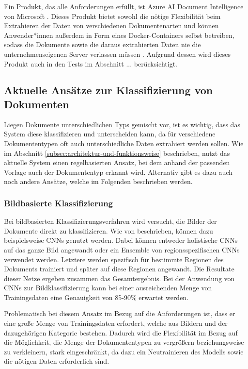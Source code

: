 Ein Produkt, das alle Anforderungen erfüllt, ist Azure AI Document Intelligence von Microsoft \parencite{microsoft_azureai_documentintelligence}. Dieses Produkt bietet sowohl die nötige Flexibilität beim Extrahieren der Daten von verschiedenen Dokumentenarten und können Anwender*innen außerdem in Form eines Docker-Containers selbst betreiben, sodass die Dokumente sowie die daraus extrahierten Daten nie die unternehmenseigenen Server verlassen müssen \parencite{microsoft_azureai_documentintelligence_containers}. Aufgrund dessen wird dieses Produkt auch in den Tests im Abschnitt ... berücksichtigt.

\subsection{Aktuelle Ansätze zur Klassifizierung von Dokumenten}
\label{subsec:aktuelle-ansätze-zur-klassifizierung-von-dokumenten}

Liegen Dokumente unterschiedlichen Typs gemischt vor, ist es wichtig, dass das System diese klassifizieren und unterscheiden kann, da für verschiedene Dokumententypen oft auch unterschiedliche Daten extrahiert werden sollen. Wie im Abschnitt \ref{subsec:architektur-und-funktionsweise} beschrieben, nutzt das aktuelle System einen regelbasierten Ansatz, bei dem anhand der passenden Vorlage auch der Dokumententyp erkannt wird. Alternativ gibt es dazu auch noch andere Ansätze, welche im Folgenden beschrieben werden.

\subsubsection{Bildbasierte Klassifizierung}
\label{subsubsec:bild-basierte-klassifizieurng}

Bei bildbasierten Klassifizierungsverfahren wird versucht, die Bilder der Dokumente direkt zu klassifizieren. Wie von \textcite{HarleyAdamW2015EoDC} beschrieben, können dazu beispielsweise CNNs genutzt werden. Dabei können entweder holistische CNNs auf das ganze Bild angewandt oder ein Ensemble von regionsspezifischen CNNs verwendet werden. Letztere werden spezifisch für bestimmte Regionen des Dokuments trainiert und später auf diese Regionen angewandt. Die Resultate dieser Netze ergeben zusammen das Gesamtergebnis. Bei der Anwendung von CNNs zur Bildklassifizierung kann bei einer ausreichenden Menge von Trainingsdaten eine Genauigkeit von 85-90\% erwartet werden.

Problematisch bei diesem Ansatz im Bezug auf die Anforderungen ist, dass er eine große Menge von Trainingsdaten erfordert, welche aus Bildern und der dazugehörigen Kategorie bestehen. Dadurch wird die Flexibilität im Bezug auf die Möglichkeit, die Menge der Dokumententypen zu vergrößern beziehungsweise zu verkleinern, stark eingeschränkt, da dazu ein Neutrainieren des Modells sowie die nötigen Daten erforderlich sind.

